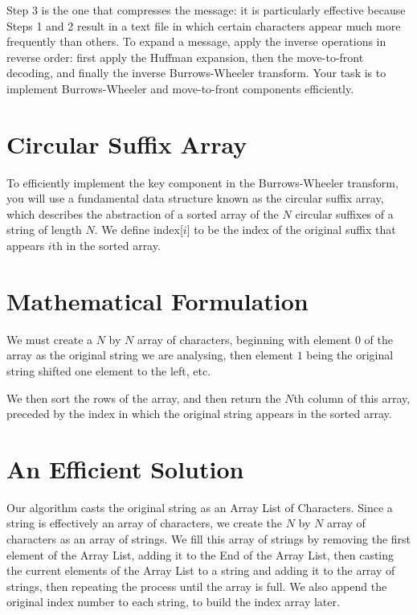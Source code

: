 \documentclass[12pt]{article}
\begin{document}
Step 3 is the one that compresses the message: it is particularly effective because Steps 1 and 2 result in a text file in which certain characters appear much more frequently than others. To expand a message, apply the inverse operations in reverse order: first apply the Huffman expansion, then the move-to-front decoding, and finally the inverse Burrows-Wheeler transform. Your task is to implement Burrows-Wheeler and move-to-front components efficiently. 


\newpage


\section{Circular Suffix Array}
 To efficiently implement the key component in the Burrows-Wheeler transform, you will use a fundamental data structure known as the circular suffix array, which describes the abstraction of a sorted array of the $N$ circular suffixes of a string of length $N$. We define index[$i$] to be the index of the original suffix that appears $i$th in the sorted array.
 
 


\section{Mathematical Formulation}
We must create a $N$ by $N$ array of characters, beginning with element $0$ of the array as the original string we are analysing, then element $1$ being the original string shifted one element to the left, etc.

We then sort the rows of the array, and then return the $N$th column 
of this array, preceded by the index in which the original string 
appears in the sorted array.

\section{An Efficient Solution}

Our algorithm casts the original string as an Array List of Characters. 
Since a string is effectively an array of characters, we create the 
$N$ by $N$ array of characters as an array of strings. We fill this 
array of strings by removing the first element of the Array List, 
adding it to the End of the Array List, then casting the current 
elements of the Array List to a string and adding it to the array of 
strings, then repeating the process until the array is full. We also 
append the original index number to each string, to build the index 
array later.
\end{document}
